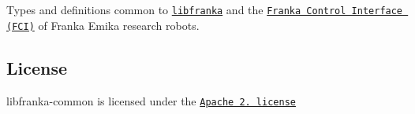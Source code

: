 Types and definitions common to \href{https://frankaemika.github.io/libfranka}{\tt {\ttfamily libfranka}} and the \href{https://frankaemika.github.io/docs}{\tt Franka Control Interface (F\+CI)} of Franka Emika research robots.

\subsection*{License}

{\ttfamily libfranka-\/common} is licensed under the \href{https://www.apache.org/licenses/LICENSE-2.0.html}{\tt Apache 2. license} 